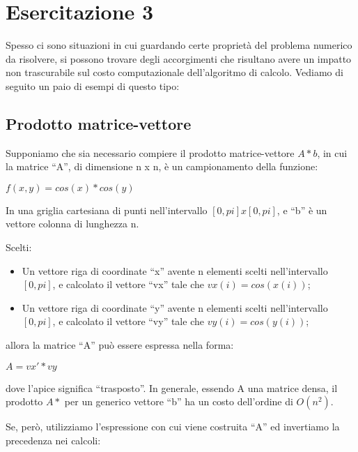 \section{Esercitazione 3}

Spesso ci sono situazioni in cui guardando certe proprietà del problema numerico da risolvere, si possono trovare degli accorgimenti che risultano avere un impatto non trascurabile sul costo computazionale dell'algoritmo di calcolo. Vediamo di seguito un paio di esempi di questo tipo:

\subsection{Prodotto matrice-vettore}

Supponiamo che sia necessario compiere il prodotto matrice-vettore $A*b$,  in cui la matrice ``A'', di dimensione n x n, è un campionamento della funzione:

\begin{center}  

$f(x,y) = cos(x)*cos(y)$

\end{center}

In una griglia cartesiana di punti nell'intervallo $[0, pi] x [0, pi]$, e ``b'' è un vettore colonna di lunghezza n.

Scelti:

\begin{itemize}
\item Un vettore riga di coordinate ``x'' avente n elementi scelti nell'intervallo $[0, pi]$,  e calcolato il vettore ``vx'' tale che  $vx(i) = cos(x(i))$;
\item Un vettore riga di coordinate ``y'' avente n elementi scelti nell'intervallo $[0, pi]$,  e calcolato il vettore ``vy'' tale che  $vy(i) = cos(y(i))$;
\end{itemize}

allora la matrice ``A'' può essere espressa nella forma:

\begin{center}
$A  =  vx' * vy$
\end{center}

dove l'apice significa ``trasposto''.  In generale, essendo A una matrice densa, il prodotto $A*$ per un generico vettore ``b'' ha un costo dell'ordine di  $O(n^2)$. 

Se, però, utilizziamo l'espressione con cui viene costruita ``A'' ed invertiamo la precedenza nei calcoli:

